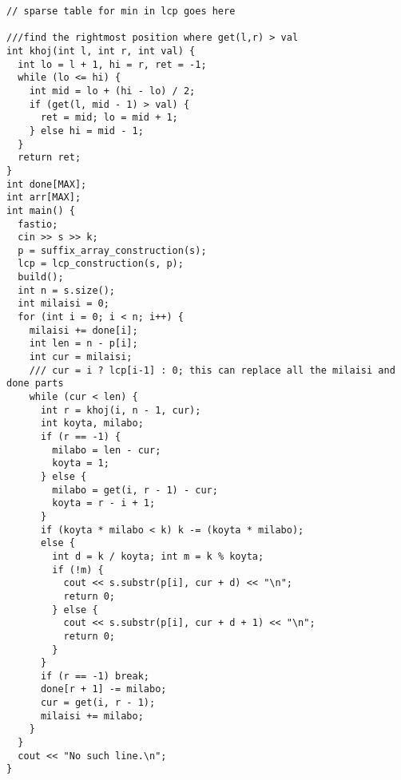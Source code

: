 \documentclass[10pt,a4paper,onesided]{article}
\begin{document}
\begin{multicols*}{3}
\begin{lstlisting}
// sparse table for min in lcp goes here

///find the rightmost position where get(l,r) > val
int khoj(int l, int r, int val) {
  int lo = l + 1, hi = r, ret = -1;
  while (lo <= hi) {
    int mid = lo + (hi - lo) / 2;
    if (get(l, mid - 1) > val) {
      ret = mid; lo = mid + 1;
    } else hi = mid - 1;
  }
  return ret;
}
int done[MAX];
int arr[MAX];
int main() {
  fastio;
  cin >> s >> k;
  p = suffix_array_construction(s);
  lcp = lcp_construction(s, p);
  build();
  int n = s.size();
  int milaisi = 0;
  for (int i = 0; i < n; i++) {
    milaisi += done[i];
    int len = n - p[i];
    int cur = milaisi;
    /// cur = i ? lcp[i-1] : 0; this can replace all the milaisi and done parts
    while (cur < len) {
      int r = khoj(i, n - 1, cur);
      int koyta, milabo;
      if (r == -1) {
        milabo = len - cur;
        koyta = 1;
      } else {
        milabo = get(i, r - 1) - cur;
        koyta = r - i + 1;
      }
      if (koyta * milabo < k) k -= (koyta * milabo);
      else {
        int d = k / koyta; int m = k % koyta;
        if (!m) {
          cout << s.substr(p[i], cur + d) << "\n";
          return 0;
        } else {
          cout << s.substr(p[i], cur + d + 1) << "\n";
          return 0;
        }
      }
      if (r == -1) break;
      done[r + 1] -= milabo;
      cur = get(i, r - 1);
      milaisi += milabo;
    }
  }
  cout << "No such line.\n";
}
\end{lstlisting}

\end{multicols*}
\end{document}
